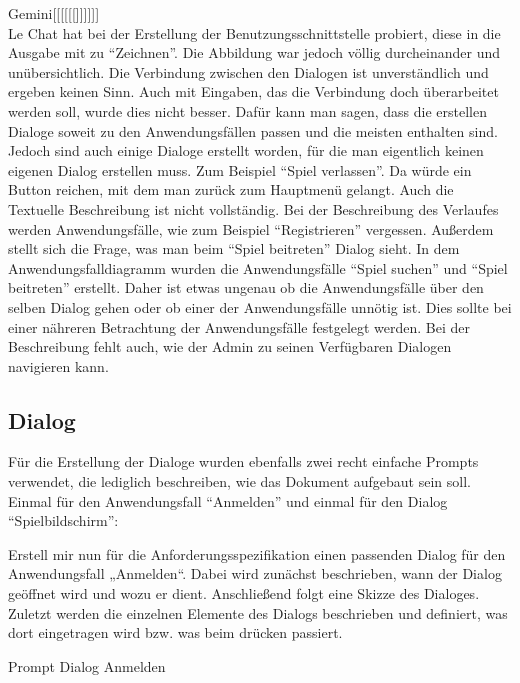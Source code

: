 Gemini[[[[[[]]]]]]\\

Le Chat hat bei der Erstellung der Benutzungsschnittstelle probiert, diese in die Ausgabe mit zu ``Zeichnen''. Die Abbildung war jedoch 
völlig durcheinander und unübersichtlich. Die Verbindung zwischen den Dialogen ist unverständlich und ergeben keinen Sinn. Auch mit Eingaben, 
das die Verbindung doch überarbeitet werden soll, wurde dies nicht besser. Dafür kann man sagen, dass die erstellen Dialoge soweit zu den 
Anwendungsfällen passen und die meisten enthalten sind. Jedoch sind auch einige Dialoge erstellt worden, für die man eigentlich keinen eigenen
Dialog erstellen muss. Zum Beispiel ``Spiel verlassen''. Da würde ein Button reichen, mit dem man zurück zum Hauptmenü gelangt. Auch die 
Textuelle Beschreibung ist nicht vollständig. Bei der Beschreibung des Verlaufes werden Anwendungsfälle, wie zum Beispiel ``Registrieren'' vergessen.
Außerdem stellt sich die Frage, was man beim ``Spiel beitreten'' Dialog sieht. In dem Anwendungsfalldiagramm wurden die Anwendungsfälle ``Spiel suchen'' 
und ``Spiel beitreten'' erstellt. Daher ist etwas ungenau ob die Anwendungsfälle über den selben Dialog gehen oder ob einer der Anwendungsfälle unnötig 
ist. Dies sollte bei einer nähreren Betrachtung der Anwendungsfälle festgelegt werden. Bei der Beschreibung fehlt auch, wie der Admin zu seinen 
Verfügbaren Dialogen navigieren kann.


\subsection*{Dialog}

Für die Erstellung der Dialoge wurden ebenfalls zwei recht einfache Prompts verwendet, die lediglich beschreiben, wie das Dokument 
aufgebaut sein soll. Einmal für den Anwendungsfall ``Anmelden'' und einmal für den Dialog ``Spielbildschirm'':

\begin{prompt}[H]
    \begin{tcolorbox}[colback=gray!20, colframe=gray!20, boxrule=0pt, sharp corners] 
        Erstell mir nun für die Anforderungsspezifikation einen passenden Dialog für den Anwendungsfall „Anmelden“. Dabei wird zunächst 
        beschrieben, wann der Dialog geöffnet wird und wozu er dient. Anschließend folgt eine Skizze des Dialoges. Zuletzt werden die 
        einzelnen Elemente des Dialogs beschrieben und definiert, was dort eingetragen wird bzw. was beim drücken passiert.
        \vfill
    \end{tcolorbox}
    \caption{Prompt Dialog Anmelden}
    \label{Prompt Dialog Anmelden}
\end{prompt}

